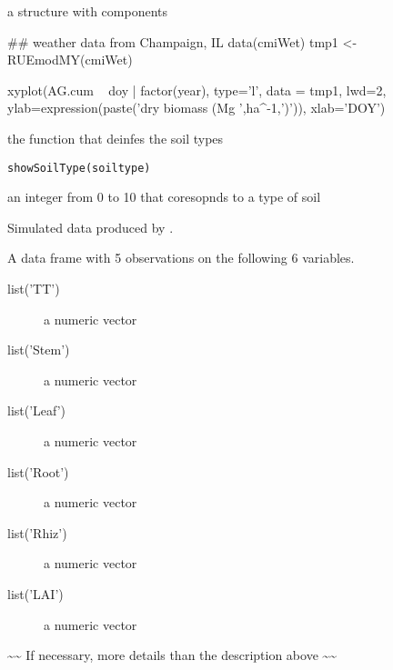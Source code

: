 \documentclass[letterpaper]{book}
\begin{document}
\begin{Value}
a  structure with components
\end{Value}
%
\begin{Examples}
\begin{ExampleCode}
## weather data from Champaign, IL
data(cmiWet)
tmp1 <- RUEmodMY(cmiWet)

xyplot(AG.cum ~ doy | factor(year), type='l', data = tmp1,
       lwd=2,
       ylab=expression(paste('dry biomass (Mg ',ha^-1,')')),
       xlab='DOY')
\end{ExampleCode}
\end{Examples}
%
\begin{Description}\relax
the function that deinfes the soil types
\end{Description}
%
\begin{Usage}
\begin{verbatim}
showSoilType(soiltype)
\end{verbatim}
\end{Usage}
%
\begin{Arguments}
\begin{ldescription}
\item[\code{soiltype}] an integer from 0 to 10 that coresopnds
to a type of soil
\end{ldescription}
\end{Arguments}
%
\begin{Description}\relax
Simulated data produced by .
\end{Description}
%
\begin{Format}
A data frame with 5 observations on the following 6 variables.
\begin{description}
 \item[list('TT')] a numeric vector\item[list('Stem')] a
numeric vector\item[list('Leaf')] a numeric vector\item[list('Root')] a
numeric vector\item[list('Rhiz')] a numeric vector\item[list('LAI')] a
numeric vector
\end{description}
\end{Format}
%
\begin{Details}\relax
\textasciitilde{}\textasciitilde{} If necessary, more details than the description above
\textasciitilde{}\textasciitilde{}
\end{Details}
\end{document}
